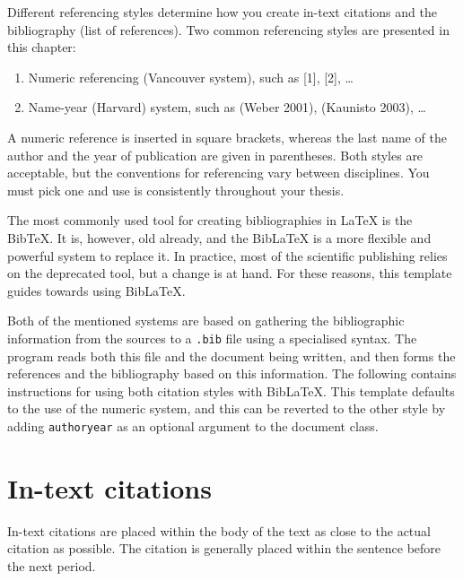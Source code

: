 Different referencing styles determine how you create in-text citations and the bibliography (list of references). Two common referencing styles are presented in this chapter:
\begin{enumerate}
    \item Numeric referencing (Vancouver system), such as [1], [2], \ldots
    \item Name-year (Harvard) system, such as (Weber 2001), (Kaunisto 2003), \ldots
\end{enumerate}
A numeric reference is inserted in square brackets, whereas the last name of the author and the year of publication are given in parentheses. Both styles are acceptable, but the conventions for referencing vary between disciplines. You must pick one and use is consistently throughout your thesis.

The most commonly used tool for creating bibliographies in \LaTeX{} is the Bib\TeX. It is, however, old already, and the Bib\LaTeX{} \parencite{biblatex} is a more flexible and powerful system to replace it. In practice, most of the scientific publishing relies on the deprecated tool, but a change is at hand. For these reasons, this template guides towards using Bib\LaTeX.

Both of the mentioned systems are based on gathering the bibliographic information from the sources to a \texttt{.bib} file using a specialised syntax. The program reads both this file and the document being written, and then forms the references and the bibliography based on this information. The following contains instructions for using both citation styles with Bib\LaTeX. This template defaults to the use of the numeric system, and this can be reverted to the other style by adding \texttt{authoryear} as an optional argument to the document class.

\section{In-text citations}

In-text citations are placed within the body of the text as close to the actual citation as possible. The citation is generally placed within the sentence before the next period.

